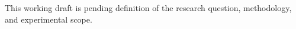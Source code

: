 This working draft is pending definition of the research question, methodology, and experimental scope.
